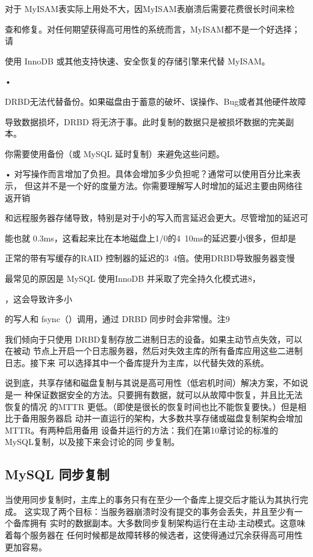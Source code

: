对于 MyISAM表实际上用处不大，因MyISAM表崩溃后需要花费很长时间来检

查和修复。对任何期望获得高可用性的系统而言，MyISAM都不是一个好选择；请

使用 InnoDB 或其他支持快速、安全恢复的存储引擎来代替 MyISAM。

•

DRBD无法代替备份。如果磁盘由于蓄意的破坏、误操作、Bug或者其他硬件故障

导致数据损坏，DRBD 将无济于事。此时复制的数据只是被损坏数据的完美副本。

你需要使用备份（或 MySQL 延时复制）来避免这些问题。

• 对写操作而言增加了负担。具体会增加多少负担呢？通常可以使用百分比来表示，
但这并不是一个好的度量方法。你需要理解写人时增加的延迟主要由网络往返开销

和远程服务器存储导致，特别是对于小的写入而言延迟会更大。尽管增加的延迟可

能也就 0.3ms，这看起来比在本地磁盘上1/0的4~10ms的延迟要小很多，但却是

正常的带有写缓存的RAID 控制器的延迟的3~4倍。使用DRBD导致服务器变慢

最常见的原因是 MySQL 使用InnoDB 并采取了完全持久化模式进8，

，这会导致许多小

的写人和 fsync（）调用，通过 DRBD 同步时会非常慢。注9

我们倾向于只使用 DRBD复制存放二进制日志的设备。如果主动节点失效，可以在被动
节点上开启一个日志服务器，然后对失效主库的所有备库应用这些二进制日志。接下来
可以选择其中一个备库提升为主库，以代替失效的系统。

说到底，共享存储和磁盘复制与其说是高可用性（低宕机时间）解决方案，不如说是一
种保证数据安全的方法。只要拥有数据，就可以从故障中恢复，并且比无法恢复的情况
的MTTR 更低。（即使是很长的恢复时间也比不能恢复要快。）但是相比于备用服务器启
动并一直运行的架构，大多数共享存储或磁盘复制架构会增加 MTTR。有两种启用备用
设备并运行的方法：我们在第10章讨论的标准的 MySQL复制，以及接下来会讨论的同
步复制。

\subsection{MySQL 同步复制}
当使用同步复制时，主库上的事务只有在至少一个备库上提交后才能认为其执行完成。
这实现了两个目标：当服务器崩溃时没有提交的事务会丢失，并且至少有一个备库拥有
实时的数据副本。大多数同步复制架构运行在主动-主动模式。这意味着每个服务器在
任何时候都是故障转移的候选者，这使得通过冗余获得高可用性更加容易。

